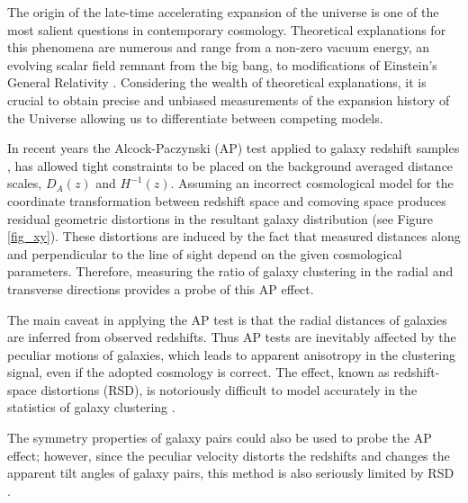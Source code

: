 \documentclass[iop]{emulateapj}
\begin{document}
The  origin  of  the late-time accelerating  expansion  of  the  universe  is  one of  the  most  salient  questions  in  contemporary cosmology. 
Theoretical explanations for this phenomena are numerous and range from a non-zero  vacuum energy, an evolving  scalar  field  remnant  from  the  big  bang, 
to modifications of Einstein's General Relativity \citep{2012IJMPD..2130002Y}. 
Considering the wealth of theoretical explanations, 
it is crucial to obtain precise and unbiased measurements of the expansion history of the Universe allowing us to 
differentiate between competing models. 

In recent years the Alcock-Paczynski (AP) test \citep{AP1979} applied to galaxy redshift samples \citep{Outram2004,Blake2011,Alam2016}, 
has allowed tight constraints to be placed on the background averaged distance scales, $D_A(z)$ and $H^{-1}(z)$.  
Assuming an incorrect cosmological model for the coordinate transformation between redshift space and comoving space
produces residual geometric distortions in the resultant galaxy distribution (see Figure \ref{fig_xy}). 
These distortions are induced by the fact that measured distances along 
and perpendicular to the line of sight depend on the given cosmological parameters. 
Therefore, measuring the ratio of galaxy clustering in the radial and transverse directions provides a probe of this AP effect.


The main caveat in applying the AP test is that 
the radial distances of galaxies are inferred from observed redshifts.
Thus AP tests are inevitably affected by the peculiar motions of galaxies,
which leads to apparent anisotropy in the clustering signal, even if the adopted cosmology is correct.
The effect, known as redshift-space distortions (RSD),
is notoriously difficult to model accurately in the statistics of galaxy clustering \citep{Ballinger1996}.

The symmetry properties of galaxy pairs \citep{Marinoni2010}  could also be used to probe the AP effect;
however, since the peculiar velocity distorts the redshifts and changes the apparent tilt angles of galaxy pairs,
this method is also seriously limited by RSD \citep{Jennings2011}.
\end{document}
